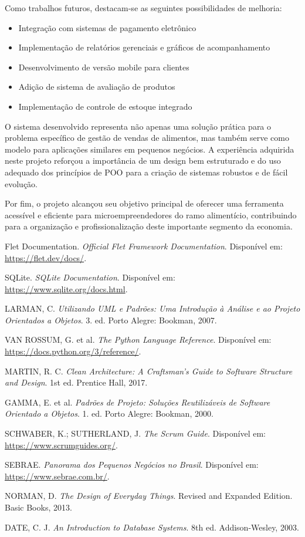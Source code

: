 \documentclass[conference]{IEEEtran}
\begin{document}
Como trabalhos futuros, destacam-se as seguintes possibilidades de melhoria:
\begin{itemize}
    \item Integração com sistemas de pagamento eletrônico
    \item Implementação de relatórios gerenciais e gráficos de acompanhamento
    \item Desenvolvimento de versão mobile para clientes
    \item Adição de sistema de avaliação de produtos
    \item Implementação de controle de estoque integrado
\end{itemize}

O sistema desenvolvido representa não apenas uma solução prática para o problema específico de gestão de vendas de alimentos, mas também serve como modelo para aplicações similares em pequenos negócios. A experiência adquirida neste projeto reforçou a importância de um design bem estruturado e do uso adequado dos princípios de POO para a criação de sistemas robustos e de fácil evolução.

Por fim, o projeto alcançou seu objetivo principal de oferecer uma ferramenta acessível e eficiente para microempreendedores do ramo alimentício, contribuindo para a organização e profissionalização deste importante segmento da economia.

\begin{thebibliography}{9}

Flet Documentation. 
\textit{Official Flet Framework Documentation}. 
Disponível em: \url{https://flet.dev/docs/}. 

SQLite. 
\textit{SQLite Documentation}. 
Disponível em: \url{https://www.sqlite.org/docs.html}. 

LARMAN, C. 
\textit{Utilizando UML e Padrões: Uma Introdução à Análise e ao Projeto Orientados a Objetos}. 
3. ed. Porto Alegre: Bookman, 2007.

VAN ROSSUM, G. et al. 
\textit{The Python Language Reference}. 
Disponível em: \url{https://docs.python.org/3/reference/}. 

MARTIN, R. C. 
\textit{Clean Architecture: A Craftsman's Guide to Software Structure and Design}. 
1st ed. Prentice Hall, 2017.

GAMMA, E. et al. 
\textit{Padrões de Projeto: Soluções Reutilizáveis de Software Orientado a Objetos}. 
1. ed. Porto Alegre: Bookman, 2000.

SCHWABER, K.; SUTHERLAND, J. 
\textit{The Scrum Guide}. 
Disponível em: \url{https://www.scrumguides.org/}. 

SEBRAE. 
\textit{Panorama dos Pequenos Negócios no Brasil}. 
Disponível em: \url{https://www.sebrae.com.br/}. 

NORMAN, D. 
\textit{The Design of Everyday Things}. 
Revised and Expanded Edition. Basic Books, 2013.

DATE, C. J. 
\textit{An Introduction to Database Systems}. 
8th ed. Addison-Wesley, 2003.

\end{thebibliography}
\end{document}
